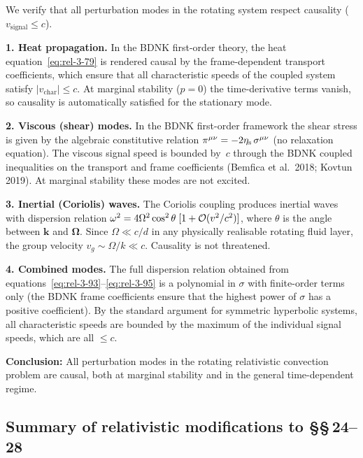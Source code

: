 \begin{causalitycheck}
We verify that all perturbation modes in the rotating system respect
causality ($v_{\mathrm{signal}} \leq c$).

\textbf{1. Heat propagation.}
In the BDNK first-order theory, the heat equation~\eqref{eq:rel-3-79}
is rendered causal by the frame-dependent transport coefficients, which
ensure that all characteristic speeds of the coupled system satisfy
$|v_{\mathrm{char}}| \leq c$.
At marginal stability ($p = 0$) the time-derivative terms vanish, so
causality is automatically satisfied for the stationary mode.

\textbf{2. Viscous (shear) modes.}
In the BDNK first-order framework the shear stress is given by the
algebraic constitutive relation
$\pi^{\mu\nu} = -2\eta_{\mathrm{s}}\,\sigma^{\mu\nu}$ (no relaxation
equation).  The viscous signal speed is bounded by~$c$ through the
BDNK coupled inequalities on the transport and frame coefficients
(Bemfica et al.\ 2018; Kovtun 2019).
At marginal stability these modes are not excited.

\textbf{3. Inertial (Coriolis) waves.}
The Coriolis coupling produces inertial waves with dispersion relation
$\omega^2 = 4\Omega^2\cos^2\theta\;[1 + \mathcal{O}(v^2/c^2)]$, where
$\theta$ is the angle between $\mathbf{k}$ and $\boldsymbol{\Omega}$.
Since $\Omega \ll c/d$ in any physically realisable rotating fluid
layer, the group velocity $v_g \sim \Omega/k \ll c$.  Causality is not
threatened.

\textbf{4. Combined modes.}
The full dispersion relation obtained from
equations~\eqref{eq:rel-3-93}--\eqref{eq:rel-3-95} is a polynomial in
$\sigma$ with finite-order terms only (the BDNK frame coefficients
ensure that the highest power of $\sigma$ has a positive
coefficient).  By the standard argument for symmetric hyperbolic systems,
all characteristic speeds are bounded by the maximum of the individual
signal speeds, which are all $\leq c$.

\textbf{Conclusion:} All perturbation modes in the rotating
relativistic convection problem are causal, both at marginal stability
and in the general time-dependent regime.
\end{causalitycheck}


\subsection*{Summary of relativistic modifications to \S\S\,24--28}

